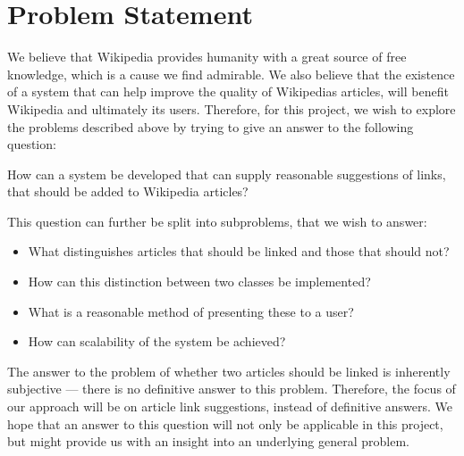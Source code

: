 \section{Problem Statement}\label{sec:problem_statement}

We believe that Wikipedia provides humanity with a great source of free knowledge, which is a cause we find admirable. We also believe that the existence of a system that can help improve the quality of Wikipedias articles, will benefit Wikipedia and ultimately its users. Therefore, for this project, we wish to explore the problems described above by trying to give an answer to the following question:

\begin{formal}
How can a system be developed that can supply reasonable suggestions of links, that should be added to Wikipedia articles?
\end{formal}

This question can further be split into subproblems, that we wish to answer:
\begin{itemize}
	\item What distinguishes articles that should be linked and those that should not?
  \item How can this distinction between two classes be implemented?
  \item What is a reasonable method of presenting these to a user?
  \item How can scalability of the system be achieved?
\end{itemize}

The answer to the problem of whether two articles should be linked is inherently subjective --- there is no definitive answer to this problem. Therefore, the focus of our approach will be on article link suggestions, instead of definitive answers. We hope that an answer to this question will not only be applicable in this project, but might provide us with an insight into an underlying general problem.



